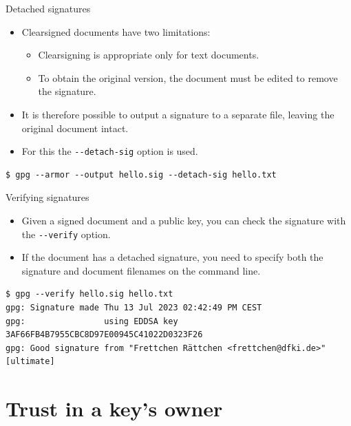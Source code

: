 \documentclass[
mode=present,
paper=smartboard,
size=20pt,
]{powerdot}
\newcommand{\clopt}[1]{\texttt{{-}#1}}
\begin{document}
\makeatletter\renewcommand{\verbatim@font}{\footnotesize\tt}\makeatother
\begin{slide}[method=direct]{Detached signatures}
  \begin{itemize}
  \item Clearsigned documents have two limitations:
    \begin{itemize}
    \item Clearsigning is appropriate only for text documents.
    \item To obtain the original version, the document must be edited
      to remove the signature.
    \end{itemize}
  \item It is therefore possible to output a signature to a separate
    file, leaving the original document intact.
  \item For this the \clopt{-detach-sig} option is used.
  \end{itemize}
\begin{verbatim}
$ gpg --armor --output hello.sig --detach-sig hello.txt
\end{verbatim}
\end{slide}

\begin{slide}[method=direct]{Verifying signatures}
  \begin{itemize}
  \item Given a signed document and a public key, you can check the
    signature with the \clopt{-verify} option.
  \item If the document has a detached signature, you need to specify
    both the signature and document filenames on the command line.
  \end{itemize}
\begin{verbatim}
$ gpg --verify hello.sig hello.txt
gpg: Signature made Thu 13 Jul 2023 02:42:49 PM CEST
gpg:                using EDDSA key 3AF66FB4B7955CBC8D97E00945C41022D0323F26
gpg: Good signature from "Frettchen Rättchen <frettchen@dfki.de>" [ultimate]
\end{verbatim}
\end{slide}

\section{Trust in a key's owner}
\end{document}
